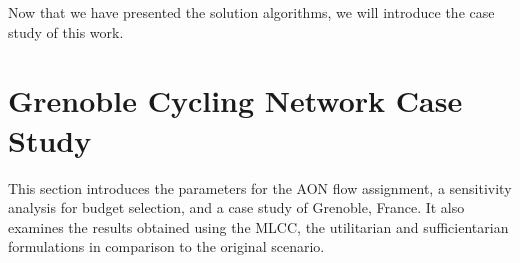 \documentclass[lettersize,journal]{IEEEtran}
\begin{document}

Now that we have presented the solution algorithms, we will introduce the case study of this work.
\section{Grenoble Cycling Network Case Study}
\label{study_case}
This section introduces the parameters for the AON flow assignment, a sensitivity analysis for budget selection, and a case study of Grenoble, France. It also examines the results obtained using the MLCC, the utilitarian and sufficientarian formulations in comparison to the original scenario.
\end{document}
